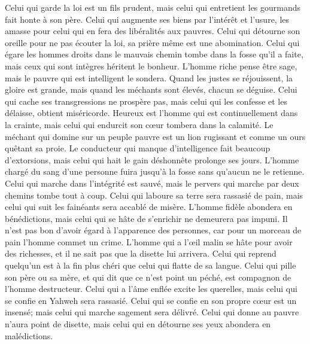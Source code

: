 \begin{multicols}{2}
Celui qui garde la loi est un fils prudent, mais celui qui entretient les gourmands fait honte à son père.
Celui qui augmente ses biens par l'intérêt et l'usure, les amasse pour celui qui en fera des libéralités aux pauvres.
Celui qui détourne son oreille pour ne pas écouter la loi, sa prière même est une abomination.
Celui qui égare les hommes droits dans le mauvais chemin tombe dans la fosse qu'il a faite, mais ceux qui sont intègres héritent le bonheur.
L'homme riche pense être sage, mais le pauvre qui est intelligent le sondera.
Quand les justes se réjouissent, la gloire est grande, mais quand les méchants sont élevés, chacun se déguise.
Celui qui cache ses transgressions ne prospère pas, mais celui qui les confesse et les délaisse, obtient miséricorde.
Heureux est l'homme qui est continuellement dans la crainte, mais celui qui endurcit son cœur tombera dans la calamité.
Le méchant qui domine sur un peuple pauvre est un lion rugissant et comme un ours quêtant sa proie.
Le conducteur qui manque d'intelligence fait beaucoup d'extorsions, mais celui qui hait le gain déshonnête prolonge ses jours.
L'homme chargé du sang d'une personne fuira jusqu'à la fosse sans qu'aucun ne le retienne.
Celui qui marche dans l'intégrité est sauvé, mais le pervers qui marche par deux chemins tombe tout à coup.
Celui qui laboure sa terre sera rassasié de pain, mais celui qui suit les fainéants sera accablé de misère.
L'homme fidèle abondera en bénédictions, mais celui qui se hâte de s'enrichir ne demeurera pas impuni.
Il n'est pas bon d'avoir égard à l'apparence des personnes, car pour un morceau de pain l'homme commet un crime.
L'homme qui a l’œil malin se hâte pour avoir des richesses, et il ne sait pas que la disette lui arrivera.
Celui qui reprend quelqu'un est à la fin plus chéri que celui qui flatte de sa langue.
Celui qui pille son père ou sa mère, et qui dit que ce n'est point un péché, est compagnon de l'homme destructeur.
Celui qui a l'âme enflée excite les querelles, mais celui qui se confie en Yahweh sera rassasié.
Celui qui se confie en son propre cœur est un insensé; mais celui qui marche sagement sera délivré.
Celui qui donne au pauvre n'aura point de disette, mais celui qui en détourne ses yeux abondera en malédictions.

\end{multicols}
